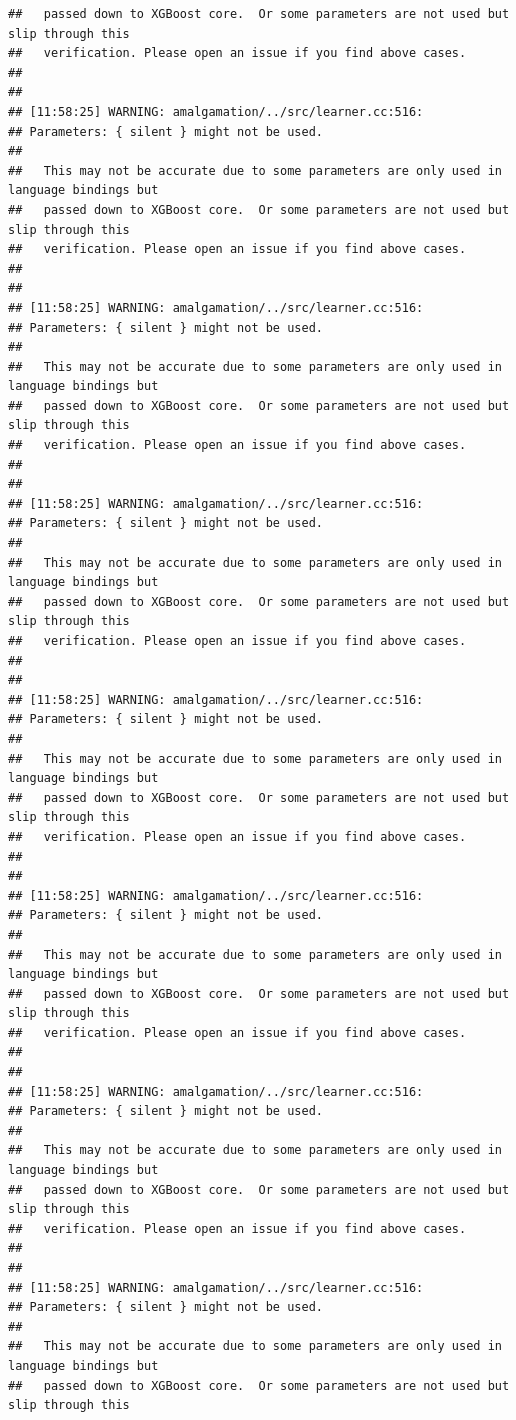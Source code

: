 \documentclass[AMS,STIX2COL]{WileyNJD-v2}\usepackage[]{graphicx}\usepackage[]{color}
\makeatletter
\newenvironment{kframe}{%
 \def\at@end@of@kframe{}%
 \ifinner\ifhmode%
  \def\at@end@of@kframe{\end{minipage}}%
  \begin{minipage}{\columnwidth}%
 \fi\fi%
 \def\FrameCommand##1{\hskip\@totalleftmargin \hskip-\fboxsep
 \colorbox{shadecolor}{##1}\hskip-\fboxsep
     \hskip-\linewidth \hskip-\@totalleftmargin \hskip\columnwidth}%
 \MakeFramed {\advance\hsize-\width
   \@totalleftmargin\z@ \linewidth\hsize
   \@setminipage}}%
 {\par\unskip\endMakeFramed%
 \at@end@of@kframe}
\newenvironment{knitrout}{}{} %
\makeatother
\begin{document}
\begin{knitrout}
\begin{kframe}
\begin{verbatim}
##   passed down to XGBoost core.  Or some parameters are not used but slip through this
##   verification. Please open an issue if you find above cases.
## 
## 
## [11:58:25] WARNING: amalgamation/../src/learner.cc:516: 
## Parameters: { silent } might not be used.
## 
##   This may not be accurate due to some parameters are only used in language bindings but
##   passed down to XGBoost core.  Or some parameters are not used but slip through this
##   verification. Please open an issue if you find above cases.
## 
## 
## [11:58:25] WARNING: amalgamation/../src/learner.cc:516: 
## Parameters: { silent } might not be used.
## 
##   This may not be accurate due to some parameters are only used in language bindings but
##   passed down to XGBoost core.  Or some parameters are not used but slip through this
##   verification. Please open an issue if you find above cases.
## 
## 
## [11:58:25] WARNING: amalgamation/../src/learner.cc:516: 
## Parameters: { silent } might not be used.
## 
##   This may not be accurate due to some parameters are only used in language bindings but
##   passed down to XGBoost core.  Or some parameters are not used but slip through this
##   verification. Please open an issue if you find above cases.
## 
## 
## [11:58:25] WARNING: amalgamation/../src/learner.cc:516: 
## Parameters: { silent } might not be used.
## 
##   This may not be accurate due to some parameters are only used in language bindings but
##   passed down to XGBoost core.  Or some parameters are not used but slip through this
##   verification. Please open an issue if you find above cases.
## 
## 
## [11:58:25] WARNING: amalgamation/../src/learner.cc:516: 
## Parameters: { silent } might not be used.
## 
##   This may not be accurate due to some parameters are only used in language bindings but
##   passed down to XGBoost core.  Or some parameters are not used but slip through this
##   verification. Please open an issue if you find above cases.
## 
## 
## [11:58:25] WARNING: amalgamation/../src/learner.cc:516: 
## Parameters: { silent } might not be used.
## 
##   This may not be accurate due to some parameters are only used in language bindings but
##   passed down to XGBoost core.  Or some parameters are not used but slip through this
##   verification. Please open an issue if you find above cases.
## 
## 
## [11:58:25] WARNING: amalgamation/../src/learner.cc:516: 
## Parameters: { silent } might not be used.
## 
##   This may not be accurate due to some parameters are only used in language bindings but
##   passed down to XGBoost core.  Or some parameters are not used but slip through this

\end{verbatim}
\end{kframe}
\end{knitrout}
\end{document}
